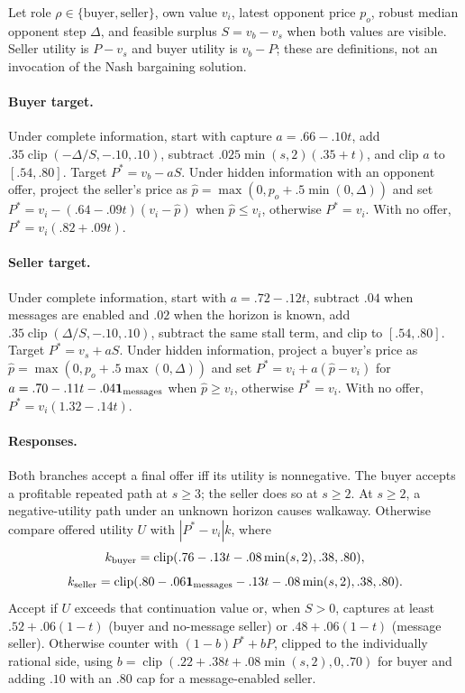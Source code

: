 Let role $\rho\in\{\text{buyer},\text{seller}\}$, own value $v_i$, latest
opponent price $p_o$, robust median opponent step $\Delta$, and feasible surplus
$S=v_b-v_s$ when both values are visible. Seller utility is $P-v_s$ and buyer
utility is $v_b-P$; these are definitions, not an invocation of the Nash
bargaining solution.

\paragraph{Buyer target.}
Under complete information, start with capture
$a=.66-.10t$, add $.35\operatorname{clip}(-\Delta/S,-.10,.10)$, subtract
$.025\min(s,2)(.35+t)$, and clip $a$ to $[.54,.80]$. Target
$P^*=v_b-aS$. Under hidden information with an opponent offer, project the
seller's price as $\hat p=\max(0,p_o+.5\min(0,\Delta))$ and set
$P^*=v_i-(.64-.09t)(v_i-\hat p)$ when $\hat p\le v_i$, otherwise $P^*=v_i$.
With no offer, $P^*=v_i(.82+.09t)$.

\paragraph{Seller target.}
Under complete information, start with $a=.72-.12t$, subtract $.04$ when
messages are enabled and $.02$ when the horizon is known, add
$.35\operatorname{clip}(\Delta/S,-.10,.10)$, subtract the same stall term, and
clip to $[.54,.80]$. Target $P^*=v_s+aS$. Under hidden information, project a
buyer's price as $\hat p=\max(0,p_o+.5\max(0,\Delta))$ and set
$P^*=v_i+a(\hat p-v_i)$ for $a=.70-.11t-.04\mathbf1_{\rm messages}$ when
$\hat p\ge v_i$, otherwise $P^*=v_i$. With no offer,
$P^*=v_i(1.32-.14t)$.

\paragraph{Responses.}
Both branches accept a final offer iff its utility is nonnegative. The buyer
accepts a profitable repeated path at $s\ge3$; the seller does so at $s\ge2$.
At $s\ge2$, a negative-utility path under an unknown horizon causes walkaway.
Otherwise compare offered utility $U$ with $|P^*-v_i|k$, where
\[
 k_{\rm buyer}=\operatorname{clip}(.76-.13t-.08\min(s,2),.38,.80),
\]
\[
 k_{\rm seller}=\operatorname{clip}(.80-.06\mathbf1_{\rm messages}
 -.13t-.08\min(s,2),.38,.80).
\]
Accept if $U$ exceeds that continuation value or, when $S>0$, captures at least
$.52+.06(1-t)$ (buyer and no-message seller) or $.48+.06(1-t)$ (message
seller). Otherwise counter with $(1-b)P^*+bP$, clipped to the individually
rational side, using
$b=\operatorname{clip}(.22+.38t+.08\min(s,2),0,.70)$ for buyer and adding $.10$
with an $.80$ cap for a message-enabled seller.

